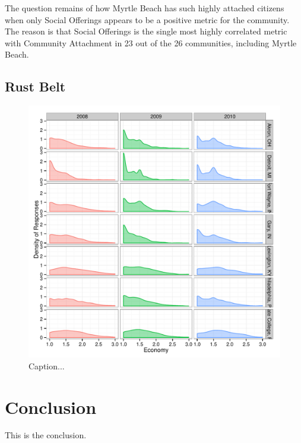 \documentclass[11pt]{article}\usepackage{knitr}
\begin{document}
The question remains of how Myrtle Beach has such highly attached citizens when only Social Offerings appears to be a positive metric for the community. The reason is that Social Offerings is the single most highly correlated metric with Community Attachment in 23 out of the 26 communities, including Myrtle Beach.

\subsection*{Rust Belt}
\begin{knitrout}
\color{fgcolor}\begin{figure}[H]

\includegraphics[width=\maxwidth]{figure/rb_one} \caption[Caption]{Caption...\label{fig:rb_one}}
\end{figure}


\end{knitrout}



\section*{Conclusion}

This is the conclusion.


\printbibliography
\end{document}
